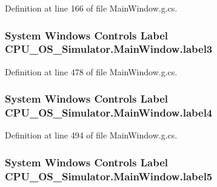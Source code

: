 Definition at line 166 of file Main\+Window.\+g.\+cs.

\hypertarget{class_c_p_u___o_s___simulator_1_1_main_window_a94cf4fbdaebb09776745893c2bce1126}{}
\subsubsection[{label3}]{\setlength{\rightskip}{0pt plus 5cm}System Windows Controls Label C\+P\+U\+\_\+\+O\+S\+\_\+\+Simulator.\+Main\+Window.\+label3\hspace{0.3cm}{\ttfamily [package]}}\label{class_c_p_u___o_s___simulator_1_1_main_window_a94cf4fbdaebb09776745893c2bce1126}


Definition at line 478 of file Main\+Window.\+g.\+cs.

\hypertarget{class_c_p_u___o_s___simulator_1_1_main_window_a3473dc873d8c8d8f4bba6e83f5684299}{}
\subsubsection[{label4}]{\setlength{\rightskip}{0pt plus 5cm}System Windows Controls Label C\+P\+U\+\_\+\+O\+S\+\_\+\+Simulator.\+Main\+Window.\+label4\hspace{0.3cm}{\ttfamily [package]}}\label{class_c_p_u___o_s___simulator_1_1_main_window_a3473dc873d8c8d8f4bba6e83f5684299}


Definition at line 494 of file Main\+Window.\+g.\+cs.

\hypertarget{class_c_p_u___o_s___simulator_1_1_main_window_a37b18e7542e985a8984375d0b1cf441e}{}
\subsubsection[{label5}]{\setlength{\rightskip}{0pt plus 5cm}System Windows Controls Label C\+P\+U\+\_\+\+O\+S\+\_\+\+Simulator.\+Main\+Window.\+label5\hspace{0.3cm}{\ttfamily [package]}}\label{class_c_p_u___o_s___simulator_1_1_main_window_a37b18e7542e985a8984375d0b1cf441e}


